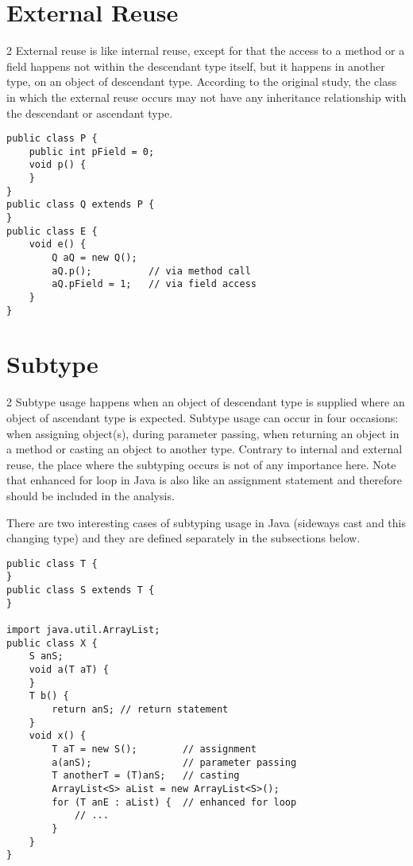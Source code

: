 \documentclass{uvamscse}
\begin{document}
\section{External Reuse}
\begin{multicols} {2}
External reuse is like internal reuse, except for that the access to a method or a field happens not within the descendant type itself, but it happens in another type, on an object of descendant type. According to the original study, the class in which the external reuse occurs may not have any inheritance relationship with the descendant or ascendant type.
\columnbreak
\begin{verbatim}
public class P {
    public int pField = 0;
    void p() {
    }
}
public class Q extends P {
}
public class E {
    void e() {
        Q aQ = new Q();
        aQ.p();          // via method call
        aQ.pField = 1;   // via field access
    }
}
\end{verbatim}
\end{multicols}


\section{Subtype}
\begin{multicols} {2}
Subtype usage happens when an object of descendant type is supplied where an object of ascendant type is expected. Subtype usage can occur in four occasions: when assigning object(s), during parameter passing, when returning an object in a method or casting an object to another type. Contrary to internal and external reuse, the place where the subtyping occurs is not of any importance here. Note that enhanced for loop in Java is also like an assignment statement and therefore should be included in the analysis.

There are two interesting cases of subtyping usage in Java (sideways cast and this changing type) and they are defined separately in the subsections below.

\columnbreak
\begin{verbatim}
public class T {
}
public class S extends T {
}
    
import java.util.ArrayList;
public class X {
    S anS;
    void a(T aT) {
    }
    T b() {
        return anS; // return statement
    }
    void x() {
        T aT = new S();        // assignment
        a(anS);                // parameter passing
        T anotherT = (T)anS;   // casting
        ArrayList<S> aList = new ArrayList<S>();
        for (T anE : aList) {  // enhanced for loop
            // ...
        }
    }
}

\end{verbatim}
\end{multicols}
\end{document}
